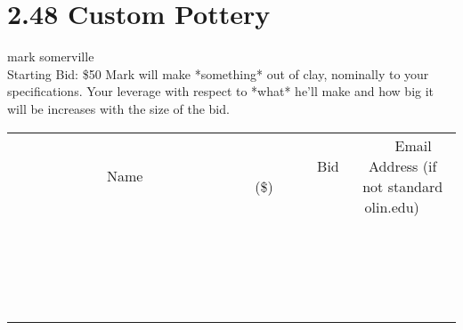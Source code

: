 \documentclass[11pt]{article}
\begin{document}
\section*{2.48 Custom Pottery}
mark somerville
\\
Starting Bid: \$50
\newline
Mark will make *something* out of clay, nominally to your specifications.  Your leverage with respect to *what* he'll make and how big it will be increases with the size of the bid.
\\[3ex]
\begin{tabular}{c c c}
~~~~~~~~~~~~~Name~~~~~~~~~~~~~ & ~~~~~~~~~Bid (\$)~~~~~~~~~  & ~~~Email Address (if not standard olin.edu)~~~\\
 & & \\
\hline
 & & \\
\hline
 & & \\
\hline
 & & \\
\hline
 & & \\
\hline
 & & \\
\hline
 & & \\
\hline
 & & \\
\hline
 & & \\
\hline
 & & \\
\hline
 & & \\
\hline
 & & \\
\hline
 & & \\
\hline
 & & \\
\hline
 & & \\
\hline
 & & \\
\hline
 & & \\
\hline
 & & \\
\hline
 & & \\
\hline
\end{tabular}
\newpage
\end{document}
